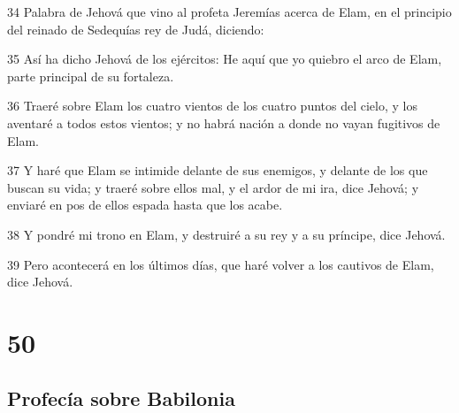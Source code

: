 \par 34 Palabra de Jehová que vino al profeta Jeremías acerca de Elam, en el principio del reinado de Sedequías rey de Judá, diciendo:
\par 35 Así ha dicho Jehová de los ejércitos: He aquí que yo quiebro el arco de Elam, parte principal de su fortaleza.
\par 36 Traeré sobre Elam los cuatro vientos de los cuatro puntos del cielo, y los aventaré a todos estos vientos; y no habrá nación a donde no vayan fugitivos de Elam.
\par 37 Y haré que Elam se intimide delante de sus enemigos, y delante de los que buscan su vida; y traeré sobre ellos mal, y el ardor de mi ira, dice Jehová; y enviaré en pos de ellos espada hasta que los acabe.
\par 38 Y pondré mi trono en Elam, y destruiré a su rey y a su príncipe, dice Jehová.
\par 39 Pero acontecerá en los últimos días, que haré volver a los cautivos de Elam, dice Jehová.

\chapter{50}

\section*{Profecía sobre Babilonia}

